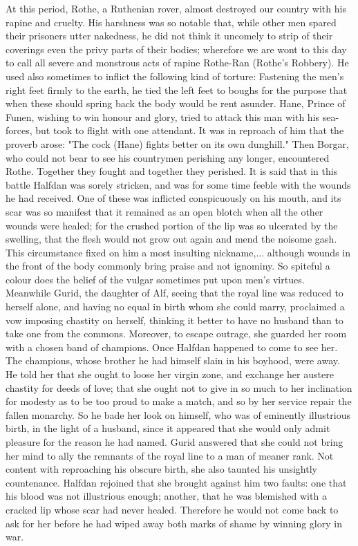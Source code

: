 \documentclass[10pt,a4paper]{report}
\begin{document}
At this period, Rothe, a Ruthenian rover, almost destroyed our country with his rapine and cruelty. His harshness was so notable that, while other men spared their prisoners utter nakedness, he did not think it uncomely to strip of their coverings even the privy parts of their bodies; wherefore we are wont to this day to call all severe and monstrous acts of rapine Rothe-Ran (Rothe's Robbery). He used also sometimes to inflict the following kind of torture: Fastening the men's right feet firmly to the earth, he tied the left feet to boughs for the purpose that when these should spring back the body would be rent asunder. Hane, Prince of Funen, wishing to win honour and glory, tried to attack this man with his sea-forces, but took to flight with one attendant. It was in reproach of him that the proverb arose: "The cock (Hane) fights better on its own dunghill." Then Borgar, who could not bear to see his countrymen perishing any longer, encountered Rothe. Together they fought and together they perished. It is said that in this battle Halfdan was sorely stricken, and was for some time feeble with the wounds he had received. One of these was inflicted conspicuously on his mouth, and its scar was so manifest that it remained as an open blotch when all the other wounds were healed; for the crushed portion of the lip was so ulcerated by the swelling, that the flesh would not grow out again and mend the noisome gash. This circumstance fixed on him a most insulting nickname,... although wounds in the front of the body commonly bring praise and not ignominy. So spiteful a colour does the belief of the vulgar sometimes put upon men's virtues.\\

Meanwhile Gurid, the daughter of Alf, seeing that the royal line was reduced to herself alone, and having no equal in birth whom she could marry, proclaimed a vow imposing chastity on herself, thinking it better to have no husband than to take one from the commons. Moreover, to escape outrage, she guarded her room with a chosen band of champions. Once Halfdan happened to come to see her. The champions, whose brother he had himself slain in his boyhood, were away. He told her that she ought to loose her virgin zone, and exchange her austere chastity for deeds of love; that she ought not to give in so much to her inclination for modesty as to be too proud to make a match, and so by her service repair the fallen monarchy. So he bade her look on himself, who was of eminently illustrious birth, in the light of a husband, since it appeared that she would only admit pleasure for the reason he had named. Gurid answered that she could not bring her mind to ally the remnants of the royal line to a man of meaner rank. Not content with reproaching his obscure birth, she also taunted his unsightly countenance. Halfdan rejoined that she brought against him two faults: one that his blood was not illustrious enough; another, that he was blemished with a cracked lip whose scar had never healed. Therefore he would not come back to ask for her before he had wiped away both marks of shame by winning glory in war.\\
\end{document}
